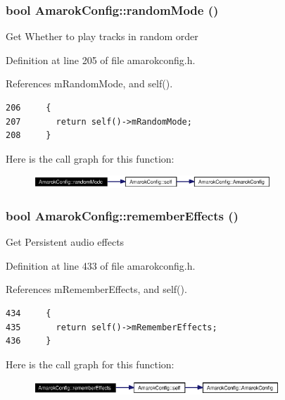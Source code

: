 \subsubsection{\setlength{\rightskip}{0pt plus 5cm}bool Amarok\-Config::random\-Mode ()\hspace{0.3cm}{\tt  [inline, static]}}\label{classAmarokConfig_AmarokConfige20}


Get Whether to play tracks in random order 

Definition at line 205 of file amarokconfig.h.

References m\-Random\-Mode, and self().



\footnotesize\begin{verbatim}206     {
207       return self()->mRandomMode;
208     }
\end{verbatim}\normalsize 


Here is the call graph for this function:\begin{figure}[H]
\begin{center}
\leavevmode
\includegraphics[width=253pt]{classAmarokConfig_AmarokConfige20_cgraph}
\end{center}
\end{figure}
\subsubsection{\setlength{\rightskip}{0pt plus 5cm}bool Amarok\-Config::remember\-Effects ()\hspace{0.3cm}{\tt  [inline, static]}}\label{classAmarokConfig_AmarokConfige44}


Get Persistent audio effects 

Definition at line 433 of file amarokconfig.h.

References m\-Remember\-Effects, and self().



\footnotesize\begin{verbatim}434     {
435       return self()->mRememberEffects;
436     }
\end{verbatim}\normalsize 


Here is the call graph for this function:\begin{figure}[H]
\begin{center}
\leavevmode
\includegraphics[width=262pt]{classAmarokConfig_AmarokConfige44_cgraph}
\end{center}
\end{figure}
